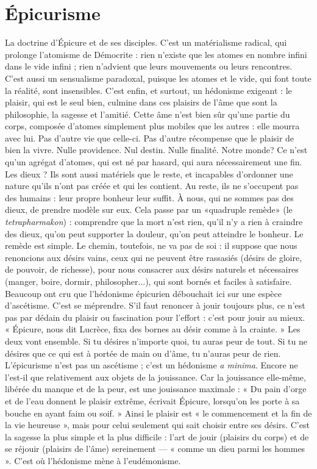 \section{Épicurisme}
La doctrine d’Épicure et de ses disciples. C’est un matérialisme
radical, qui prolonge l’atomisme de Démocrite : rien
n'existe que les atomes en nombre infini dans le vide infini ; rien n’advient que
leurs mouvements ou leurs rencontres. C’est aussi un sensualisme paradoxal,
puisque les atomes et le vide, qui font toute la réalité, sont insensibles. C’est
enfin, et surtout, un hédonisme exigeant : le plaisir, qui est le seul bien, culmine
dans ces plaisirs de l’âme que sont la philosophie, la sagesse et l'amitié.
Cette âme n’est bien sûr qu’une partie du corps, composée d’atomes simplement
plus mobiles que les autres : elle mourra avec lui. Pas d’autre vie que
celle-ci. Pas d’autre récompense que le plaisir de bien la vivre. Nulle providence.
Nul destin. Nulle finalité. Notre monde? Ce n’est qu’un agrégat
d’atomes, qui est né par hasard, qui aura nécessairement une fin. Les dieux ? Ils
sont aussi matériels que le reste, et incapables d’ordonner une nature qu’ils
n'ont pas créée et qui les contient. Au reste, ils ne s’occupent pas des humains :
leur propre bonheur leur suffit. À nous, qui ne sommes pas des dieux, de
prendre modèle sur eux. Cela passe par un «quadruple remède» (le
{\it tetrapharmakon}) : comprendre que la mort n’est rien, qu’il n’y a rien à craindre
des dieux, qu’on peut supporter la douleur, qu’on peut atteindre le bonheur.
Le remède est simple. Le chemin, toutefois, ne va pas de soi : il suppose que
nous renoncions aux désirs vains, ceux qui ne peuvent être rassasiés (désirs de
gloire, de pouvoir, de richesse), pour nous consacrer aux désirs naturels et
nécessaires (manger, boire, dormir, philosopher...), qui sont bornés et faciles à
satisfaire. Beaucoup ont cru que l’hédonisme épicurien débouchait ici sur une
espèce d’ascétisme. C’est se méprendre. S’il faut renoncer à jouir toujours plus,
ce n’est pas par dédain du plaisir ou fascination pour l'effort : c’est pour jouir au
mieux. « Épicure, nous dit Lucrèce, fixa des bornes au désir comme à la
crainte. » Les deux vont ensemble. Si tu désires n’importe quoi, tu auras peur de
tout. Si tu ne désires que ce qui est à portée de main ou d'âme, tu n’auras peur
de rien. L’épicurisme n’est pas un ascétisme ; c’est un hédonisme {\it a minima}.
Encore ne l’est-il que relativement aux objets de la jouissance. Car la jouissance
elle-même, libérée du manque et de la peur, est une jouissance maximale : « Du
pain d’orge et de l’eau donnent le plaisir extrême, écrivait Épicure, lorsqu'on les
porte à sa bouche en ayant faim ou soif. » Ainsi le plaisir est « le commencement
et la fin de la vie heureuse », mais pour celui seulement qui sait choisir entre ses
désirs. C’est la sagesse la plus simple et la plus difficile : l’art de jouir (plaisirs du
corps) et de se réjouir (plaisirs de l’âme) sereinement — « comme un dieu parmi
les hommes ». C’est où l’hédonisme mène à l’eudémonisme.

